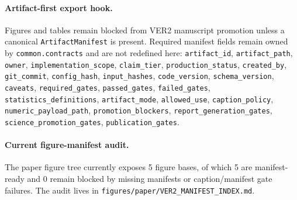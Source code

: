 \paragraph{Artifact-first export hook.}
Figures and tables remain blocked from VER2 manuscript promotion unless a
canonical \texttt{ArtifactManifest} is present. Required manifest fields
remain owned by \texttt{common.contracts} and are not redefined here:
\texttt{artifact\_id}, \texttt{artifact\_path}, \texttt{owner}, \texttt{implementation\_scope}, \texttt{claim\_tier}, \texttt{production\_status}, \texttt{created\_by}, \texttt{git\_commit}, \texttt{config\_hash}, \texttt{input\_hashes}, \texttt{code\_version}, \texttt{schema\_version}, \texttt{caveats}, \texttt{required\_gates}, \texttt{passed\_gates}, \texttt{failed\_gates}, \texttt{statistics\_definitions}, \texttt{artifact\_mode}, \texttt{allowed\_use}, \texttt{caption\_policy}, \texttt{numeric\_payload\_path}, \texttt{promotion\_blockers}, \texttt{report\_generation\_gates}, \texttt{science\_promotion\_gates}, \texttt{publication\_gates}.

\paragraph{Current figure-manifest audit.}
The paper figure tree currently exposes 5 figure bases, of which
5 are manifest-ready and 0 remain blocked by missing manifests
or caption/manifest gate failures. The audit lives in
\texttt{figures/paper/VER2\_MANIFEST\_INDEX.md}.
